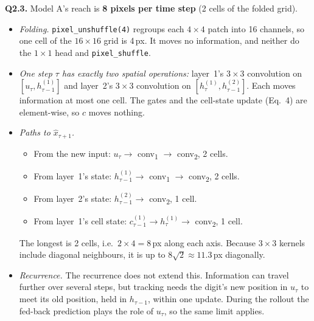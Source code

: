 \textbf{Q2.3.} Model A's reach is \textbf{8 pixels per time step} (2 cells of the folded grid).
\begin{itemize}
\item \emph{Folding.} \texttt{pixel\_unshuffle(4)} regroups each $4\times4$ patch into 16 channels, so one cell
of the $16\times16$ grid is 4\,px. It moves no information, and neither do the $1\times1$ head and
\texttt{pixel\_shuffle}.
\item \emph{One step $\tau$ has exactly two spatial operations:} layer~1's $3\times3$ convolution on
$[u_\tau,h^{(1)}_{\tau-1}]$ and layer~2's $3\times3$ convolution on $[h^{(1)}_\tau,h^{(2)}_{\tau-1}]$. Each moves
information at most one cell. The gates and the cell-state update (Eq.~4) are element-wise, so $c$ moves nothing.
\item \emph{Paths to $\hat x_{\tau+1}$.}
  \begin{itemize}
  \item From the new input: $u_\tau\to$ conv\textsubscript{1} $\to$ conv\textsubscript{2}, 2 cells.
  \item From layer~1's state: $h^{(1)}_{\tau-1}\to$ conv\textsubscript{1} $\to$ conv\textsubscript{2}, 2 cells.
  \item From layer~2's state: $h^{(2)}_{\tau-1}\to$ conv\textsubscript{2}, 1 cell.
  \item From layer~1's cell state: $c^{(1)}_{\tau-1}\to h^{(1)}_\tau\to$ conv\textsubscript{2}, 1 cell.
  \end{itemize}
  The longest is 2 cells, i.e.\ $2\times4=8$\,px along each axis. Because $3\times3$ kernels include diagonal
  neighbours, it is up to $8\sqrt2\approx11.3$\,px diagonally.
\item \emph{Recurrence.} The recurrence does not extend this. Information can travel further over several steps,
but tracking needs the digit's new position in $u_\tau$ to meet its old position, held in $h_{\tau-1}$, within
one update. During the rollout the fed-back prediction plays the role of $u_\tau$, so the same limit applies.
\end{itemize}

